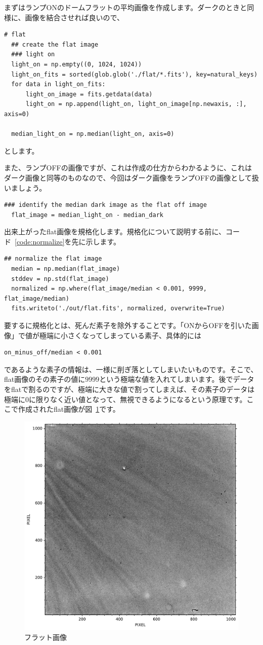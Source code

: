 まずはランプONのドームフラットの平均画像を作成します。ダークのときと同様に、画像を結合させれば良いので、
\begin{lstlisting}[caption=ランプONのフラット画像, label=code:flat_light_on]
  # flat
  ## create the flat image
  ### light on
  light_on = np.empty((0, 1024, 1024))
  light_on_fits = sorted(glob.glob('./flat/*.fits'), key=natural_keys)
  for data in light_on_fits:
      light_on_image = fits.getdata(data)
      light_on = np.append(light_on, light_on_image[np.newaxis, :], axis=0)

  median_light_on = np.median(light_on, axis=0)
\end{lstlisting}
とします。

また、ランプOFFの画像ですが、これは作成の仕方からわかるように、これはダーク画像と同等のものなので、今回はダーク画像をランプOFFの画像として扱いましょう。
\begin{lstlisting}[caption=ランプOFFのフラット画像とフラット画像の作成, label=code:flat_light_off]
  ### identify the median dark image as the flat off image
  flat_image = median_light_on - median_dark
\end{lstlisting}

出来上がったflat画像を規格化します。規格化について説明する前に、コード~\ref{code:normalize}を先に示します。
\begin{lstlisting}[caption=フラット画像の規格化,label=code_3_4_4]
  ## normalize the flat image
  median = np.median(flat_image)
  stddev = np.std(flat_image)
  normalized = np.where(flat_image/median < 0.001, 9999, flat_image/median)
  fits.writeto('./out/flat.fits', normalized, overwrite=True)
\end{lstlisting}
要するに規格化とは、死んだ素子を除外することです。「ONからOFFを引いた画像」で値が極端に小さくなってしまっている素子、具体的には
\begin{verbatim}on_minus_off/median < 0.001\end{verbatim}
であるような素子の情報は、一様に削ぎ落としてしまいたいものです。そこで、flat画像のその素子の値に$9999$という極端な値を入れてしまいます。後でデータをflatで割るのですが、極端に大きな値で割ってしまえば、その素子のデータは極端に0に限りなく近い値となって、無視できるようになるという原理です。ここで作成されたflat画像が図~\ref{fig:flat}です。
\begin{figure}
  \centering
	\includegraphics[width=0.6\linewidth]{./fig/chap_5/flat_fits.pdf}
	\caption{フラット画像}
  \label{fig:flat}
\end{figure}

